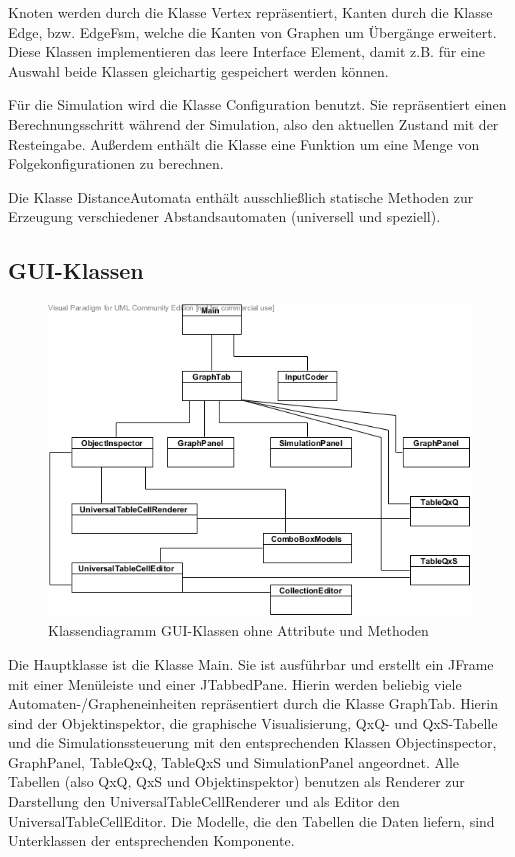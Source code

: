 Knoten werden durch die Klasse Vertex repräsentiert, Kanten durch die Klasse Edge, bzw. EdgeFsm, welche die Kanten von Graphen um Übergänge erweitert. Diese Klassen implementieren das leere Interface Element, damit z.B. für eine Auswahl beide Klassen gleichartig gespeichert werden können.

Für die Simulation wird die Klasse Configuration benutzt. Sie repräsentiert einen Berechnungsschritt während der Simulation, also den aktuellen Zustand mit der Rest\-eingabe. Außerdem enthält die Klasse eine Funktion um eine Menge von Folgekonfigurationen zu berechnen.

Die Klasse DistanceAutomata enthält ausschließlich statische Methoden zur Erzeugung verschiedener Abstandsautomaten (universell und speziell).

\subsection{GUI-Klassen}
\begin{figure}[htbp]
\centering
\includegraphics[width=\linewidth,height=\textheight,keepaspectratio]{pic/gui}%
\caption{Klassendiagramm GUI-Klassen ohne Attribute und Methoden}%
\end{figure}
Die Hauptklasse ist die Klasse Main. Sie ist ausführbar und erstellt ein JFrame mit einer Menüleiste und einer JTabbedPane. Hierin werden beliebig viele Automaten-/Grapheneinheiten repräsentiert durch die Klasse GraphTab. Hierin sind der Objektinspektor, die graphische Visualisierung, QxQ- und QxS-Tabelle und die Simulationssteuerung mit den entsprechenden Klassen Objectinspector, GraphPanel, TableQxQ, TableQxS und SimulationPanel angeordnet. Alle Tabellen (also QxQ, QxS und Objektinspektor) benutzen als Renderer zur Darstellung den UniversalTableCellRenderer und als Editor den UniversalTableCellEditor. Die Modelle, die den Tabellen die Daten liefern, sind Unterklassen der entsprechenden Komponente.

